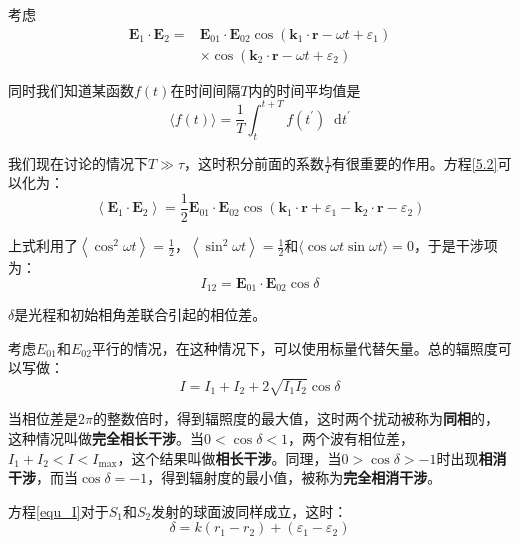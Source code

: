 \documentclass[UTF8]{ctexart}
\newcommand*{\dif}{\mathop{}\!\mathrm{d}}
\begin{document}
	考虑
	\begin{equation}
	\begin{aligned}
	\mathbf{E}_{1} \cdot \mathbf{E}_{2}=&\mathbf{E}_{01} \cdot \mathbf{E}_{02} \cos \left(\mathbf{k}_{1} \cdot \mathbf{r}-\omega t+\varepsilon_{1}\right)\\
	&\times \cos \left(\mathbf{k}_{2} \cdot \mathbf{r}-\omega t+\varepsilon_{2}\right)
	\end{aligned}\label{5.2}
	\end{equation}
	
	\noindent 同时我们知道某函数$f(t)$在时间间隔$T$内的时间平均值是
	\begin{equation}
	\langle f(t)\rangle=\frac{1}{T} \int_{t}^{t+T} f\left(t^{\prime}\right) \dif t^{\prime}
	\end{equation}
	
	\noindent 我们现在讨论的情况下$T \gg \tau$，这时积分前面的系数$\frac{1}{T}$有很重要的作用。方程\ref{5.2}可以化为：
	\begin{equation}
	\left\langle\mathbf{E}_{1} \cdot \mathbf{E}_{2}\right\rangle=\frac{1}{2} \mathbf{E}_{01} \cdot \mathbf{E}_{02} \cos \left(\mathbf{k}_{1} \cdot \mathbf{r}+\varepsilon_{1}-\mathbf{k}_{2} \cdot \mathbf{r}-\varepsilon_{2}\right)
	\end{equation}
	
	上式利用了$\left\langle\cos ^{2} \omega t\right\rangle=\frac{1}{2}$，$\left\langle\sin ^{2} \omega t\right\rangle=\frac{1}{2}$和$\langle\cos \omega t \sin \omega t\rangle=0$，于是干涉项为：
	\begin{equation}
	I_{12}=\mathbf{E}_{01} \cdot \mathbf{E}_{02} \cos \delta
	\end{equation}
	
	\noindent $\delta$是光程和初始相角差联合引起的相位差。
	
	考虑$E_{01}$和$E_{02}$平行的情况，在这种情况下，可以使用标量代替矢量。总的辐照度可以写做：
	\begin{equation}
	I=I_{1}+I_{2}+2 \sqrt{I_{1} I_{2}} \cos \delta\label{equ_I}
	\end{equation}
	
	当相位差是$2\pi$的整数倍时，得到辐照度的最大值，这时两个扰动被称为\textbf{同相}的，这种情况叫做\textbf{完全相长干涉}。当$0<\cos \delta<1$，两个波有相位差，$I_{1}+I_{2}<I<I_{\max }$，这个结果叫做\textbf{相长干涉}。同理，当$ 0>\cos \delta>-1 $时出现\textbf{相消干涉}，而当$ \cos \delta =-1 $，得到辐射度的最小值，被称为\textbf{完全相消干涉}。
	
	方程\ref{equ_I}对于$S_{1}$和$S_{2}$发射的球面波同样成立，这时：
	\begin{equation}
\delta=k\left(r_{1}-r_{2}\right)+\left(\varepsilon_{1}-\varepsilon_{2}\right)
	\end{equation}
	
\end{document}
